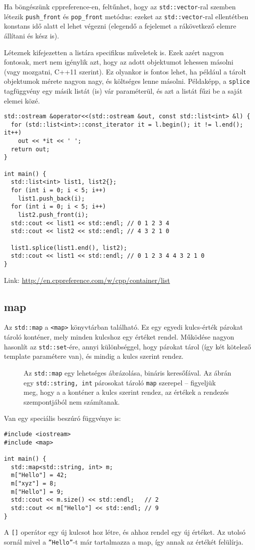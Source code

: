 \documentclass[../cpp_book/cpp_book.tex]{subfiles}
\begin{document}
	\medskip
	Ha böngészünk cppreference-en, feltűnhet, hogy az \texttt{std::vector}-ral szemben létezik \texttt{push\_front} és \texttt{pop\_front} metódus: ezeket az \texttt{std::vector}-ral ellentétben konstans idő alatt el lehet végezni (elegendő a fejelemet a rákövetkező elemre állítani és kész is).
	\medskip
	
	Léteznek kifejezetten a listára specifikus műveletek is. Ezek azért nagyon fontosak, mert nem igénylik azt, hogy az adott objektumot lehessen másolni (vagy mozgatni, C++11 szerint). Ez olyankor is fontos lehet, ha például a tárolt objektumok mérete nagyon nagy, és költséges lenne másolni. Példaképp, a \texttt{splice} tagfüggvény egy másik listát (is) vár paraméterül, és azt a listát fűzi be a saját elemei közé.
\begin{lstlisting}
std::ostream &operator<<(std::ostream &out, const std::list<int> &l) {
  for (std::list<int>::const_iterator it = l.begin(); it != l.end(); it++)
    out << *it << ' ';
  return out;
}

int main() {
  std::list<int> list1, list2{};
  for (int i = 0; i < 5; i++)
    list1.push_back(i);
  for (int i = 0; i < 5; i++)
    list2.push_front(i);
  std::cout << list1 << std::endl; // 0 1 2 3 4
  std::cout << list2 << std::endl; // 4 3 2 1 0

  list1.splice(list1.end(), list2);
  std::cout << list1 << std::endl; // 0 1 2 3 4 4 3 2 1 0
}
\end{lstlisting}
	Link: \url{http://en.cppreference.com/w/cpp/container/list}
	\subsection{map}
	Az \texttt{std::map} a \texttt{<map>} könyvtárban található. Ez egy egyedi kulcs-érték párokat tároló konténer, mely minden kulcshoz egy értéket rendel. Működése nagyon hasonlít az \texttt{std::set}-ére, annyi különbséggel, hogy párokat tárol (így két kötelező template paramétere van), és mindig a kulcs szerint rendez.
	\smallskip
	
	\begin{figure}[t]
		\centering
		
		
		\caption{Az \texttt{std::map} egy lehetséges ábrázolása, bináris keresőfával. Az ábrán egy \texttt{std::string, int} párosokat tároló \texttt{map} szerepel -- figyeljük meg, hogy a a konténer a kulcs szerint rendez, az értékek a rendezés szempontjából nem számítanak.}\label{fig_std_map}
	\end{figure}
	Van egy speciális beszúró függvénye is:
\begin{lstlisting}
#include <iostream>
#include <map>

int main() {
  std::map<std::string, int> m;
  m["Hello"] = 42;
  m["xyz"] = 8;
  m["Hello"] = 9;
  std::cout << m.size() << std::endl;   // 2
  std::cout << m["Hello"] << std::endl; // 9
}
\end{lstlisting}
	A \texttt{[]} operátor egy új kulcsot hoz létre, és ahhoz rendel egy új értéket. Az utolsó sornál mivel a \texttt{''Hello''}-t már tartalmazza a map, így annak az értékét felülírja.
	
\end{document}
